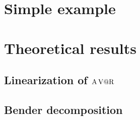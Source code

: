 \section{Simple example}


\section{Theoretical results}

\subsection{Linearization of $\operatorname{A\operatorname{V@R}}$}
\label{sec:multi-sourcing:stochastic:avar-linearization}

\subsection{Bender decomposition}



